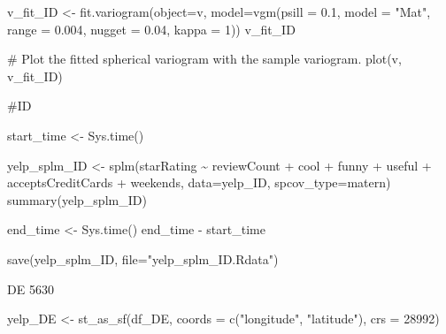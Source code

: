 \documentclass[
  12pt,
  letterpaper,
  DIV=11,
  numbers=noendperiod]{scrartcl}
\newenvironment{Shaded}{\begin{snugshade}}{\end{snugshade}}
\newcommand{\AttributeTok}[1]{\textcolor[rgb]{0.98,0.46,0.51}{#1}}
\newcommand{\CommentTok}[1]{\textcolor[rgb]{0.42,0.45,0.49}{#1}}
\newcommand{\DecValTok}[1]{\textcolor[rgb]{0.47,0.72,1.00}{#1}}
\newcommand{\FloatTok}[1]{\textcolor[rgb]{0.47,0.72,1.00}{#1}}
\newcommand{\FunctionTok}[1]{\textcolor[rgb]{0.70,0.57,0.94}{#1}}
\newcommand{\NormalTok}[1]{\textcolor[rgb]{0.88,0.89,0.91}{#1}}
\newcommand{\OtherTok}[1]{\textcolor[rgb]{0.70,0.57,0.94}{#1}}
\newcommand{\SpecialCharTok}[1]{\textcolor[rgb]{0.47,0.72,1.00}{#1}}
\newcommand{\StringTok}[1]{\textcolor[rgb]{0.62,0.80,1.00}{#1}}
\begin{document}
\begin{Shaded}
\begin{Highlighting}[]
\NormalTok{v\_fit\_ID }\OtherTok{\textless{}{-}} \FunctionTok{fit.variogram}\NormalTok{(}\AttributeTok{object=}\NormalTok{v, }
                           \AttributeTok{model=}\FunctionTok{vgm}\NormalTok{(}\AttributeTok{psill =} \FloatTok{0.1}\NormalTok{, }\AttributeTok{model =} \StringTok{"Mat"}\NormalTok{, }
                                     \AttributeTok{range =} \FloatTok{0.004}\NormalTok{, }\AttributeTok{nugget =} \FloatTok{0.04}\NormalTok{, }\AttributeTok{kappa =} \DecValTok{1}\NormalTok{))}
\NormalTok{v\_fit\_ID}

\CommentTok{\# Plot the fitted spherical variogram with the sample variogram.}
\FunctionTok{plot}\NormalTok{(v, v\_fit\_ID)}
\end{Highlighting}
\end{Shaded}

\begin{Shaded}
\begin{Highlighting}[]
\CommentTok{\#ID }

\NormalTok{start\_time }\OtherTok{\textless{}{-}} \FunctionTok{Sys.time}\NormalTok{()}


\NormalTok{yelp\_splm\_ID }\OtherTok{\textless{}{-}} \FunctionTok{splm}\NormalTok{(starRating }\SpecialCharTok{\textasciitilde{}}\NormalTok{ reviewCount }\SpecialCharTok{+}\NormalTok{ cool }\SpecialCharTok{+}\NormalTok{ funny }\SpecialCharTok{+}\NormalTok{ useful }\SpecialCharTok{+}\NormalTok{ acceptsCreditCards }\SpecialCharTok{+}\NormalTok{ weekends, }\AttributeTok{data=}\NormalTok{yelp\_ID, }\AttributeTok{spcov\_type=}\StringTok{\textquotesingle{}matern\textquotesingle{}}\NormalTok{)}
\FunctionTok{summary}\NormalTok{(yelp\_splm\_ID)}

\NormalTok{end\_time }\OtherTok{\textless{}{-}} \FunctionTok{Sys.time}\NormalTok{()}
\NormalTok{end\_time }\SpecialCharTok{{-}}\NormalTok{ start\_time}
\end{Highlighting}
\end{Shaded}

\begin{Shaded}
\begin{Highlighting}[]
\FunctionTok{save}\NormalTok{(yelp\_splm\_ID, }\AttributeTok{file=}\StringTok{"yelp\_splm\_ID.Rdata"}\NormalTok{)}
\end{Highlighting}
\end{Shaded}

DE 5630

\begin{Shaded}
\begin{Highlighting}[]
\NormalTok{yelp\_DE }\OtherTok{\textless{}{-}} \FunctionTok{st\_as\_sf}\NormalTok{(df\_DE, }\AttributeTok{coords =} \FunctionTok{c}\NormalTok{(}\StringTok{"longitude"}\NormalTok{, }\StringTok{"latitude"}\NormalTok{), }\AttributeTok{crs =} \DecValTok{28992}\NormalTok{)}
\end{Highlighting}
\end{Shaded}
\end{document}
